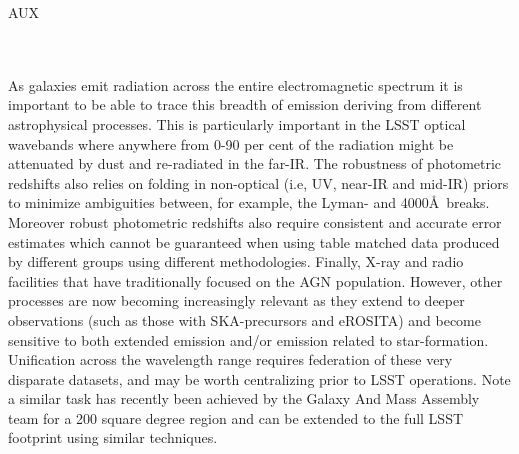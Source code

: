 {\begin{tasklist}{AUX}
\begin{task}
{\begin{enumerate}
\end{enumerate}
~\\~\\
As galaxies emit radiation across the entire electromagnetic spectrum it is important to be able to trace this breadth of emission deriving from different astrophysical processes. This is particularly important in the LSST optical wavebands where anywhere from 0-90 per cent of the radiation might be attenuated by dust and re-radiated in the far-IR. 
The robustness of photometric redshifts also relies on folding in non-optical (i.e, UV, near-IR and mid-IR) priors to minimize ambiguities between, for example, the Lyman- and 4000\AA~breaks. Moreover robust photometric redshifts also require consistent and accurate error estimates which cannot be guaranteed when using table matched data produced by different groups using different methodologies.
Finally, X-ray and radio facilities that have traditionally focused on the AGN population. However, other processes are now becoming increasingly relevant as they extend to deeper observations (such as those with SKA-precursors and eROSITA) and become sensitive to both extended emission and/or emission related to star-formation. Unification across the wavelength range requires federation of these very disparate datasets, and may be worth centralizing prior to LSST operations.
Note a similar task has recently been achieved by the Galaxy And Mass Assembly team for a 200 square degree region \citep[see][and http://www/gama-survey.org/]{driver2016a} and can be extended to the full LSST footprint using similar techniques.
}
~\\
\end{task}


\end{tasklist}}
